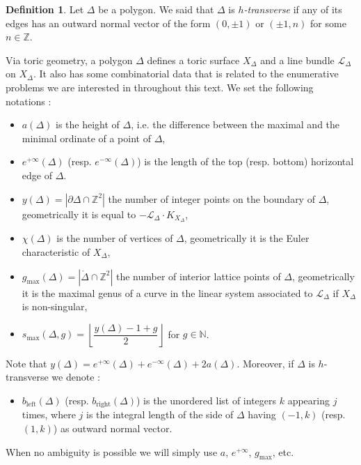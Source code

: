 \documentclass[11pt]{article}
\theoremstyle{definition}
\newtheorem{defi}[theo]{Definition}
\numberwithin{equation}{section}
\newcommand{\N}{\mathbb{N}}
\newcommand{\Z}{\mathbb{Z}}
\newcommand{\calL}{\mathcal{L}}
\newcommand{\LDelta}{\calL_\Delta}
\newcommand{\XDelta}{{X_\Delta}}
\newcommand{\bleft}{b_{\mathrm{left}}}
\newcommand{\bright}{b_{\mathrm{right}}}
\newcommand{\gmax}{g_{\max}}
\newcommand{\smax}{s_{\max}}
\theoremstyle{plain}
\begin{document}
\begin{defi} \label{def-htransverse}
Let $\Delta$ be a polygon. We said that $\Delta$ is \emph{$h$-transverse} if any of its edges has an outward normal vector of the form $(0,\pm 1)$ or $(\pm 1,n)$ for some $n\in\Z$.
\end{defi}


Via toric geometry, a polygon $\Delta$ defines a toric surface $\XDelta$ and a line bundle $\LDelta$ on $\XDelta$. 
It also has some combinatorial data that is related to the enumerative problems we are interested in throughout this text. We set the following notations :
\begin{itemize}
	\item $a(\Delta)$ is the height of $\Delta$, i.e.  the difference between the maximal and the minimal ordinate of a point of $\Delta$,
	
	\item $e^{+\infty}(\Delta)$ (resp. $e^{-\infty}(\Delta)$) is the length of the top (resp. bottom) horizontal edge of $\Delta$.
 
  	\item $y(\Delta) = |\partial \Delta \cap \Z^2|$ the number of integer points on the boundary of $\Delta$, geometrically it is equal to $- \calL_\Delta \cdot K_{X_\Delta}$, 

  	\item $\chi(\Delta)$ is the number of vertices of $\Delta$, geometrically it is the Euler characteristic of $X_\Delta$,

   \item $\gmax(\Delta) = |\mathring\Delta \cap\Z^2|$ the number of interior lattice points of $\Delta$, geometrically it is the maximal genus of a curve in the linear system associated to $\LDelta$ if $X_\Delta$ is non-singular,
  	
  	\item $\smax(\Delta,g) = \left\lfloor \dfrac{y(\Delta)-1+g}{2} \right \rfloor$ for $g\in\N$.
\end{itemize}
Note that $y(\Delta) = e^{+\infty}(\Delta) + e^{-\infty}(\Delta) + 2a(\Delta)$.
Moreover, if $\Delta$ is $h$-transverse we denote :
\begin{itemize}
	\item $\bleft(\Delta)$ (resp. $\bright(\Delta)$) is the unordered list of integers $k$ appearing $j$ times, where $j$ is the integral length of the side of $\Delta$ having $(-1,k)$ (resp. $(1,k)$) as outward normal vector. 
\end{itemize}
When no ambiguity is possible we will simply use $a$, $e^{+\infty}$, $\gmax$, etc.
\end{document}
